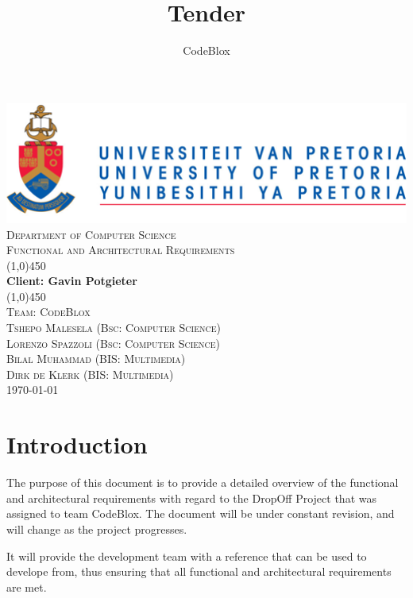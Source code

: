 \documentclass[a4paper,12pt]{article}
\author{CodeBlox}
\title{Tender}
\begin{document}
	\setlength{\parskip}{6pt}
	
	\begin{titlepage}
		\begin{center}
			\includegraphics[width=1\textwidth]{./Pictures/up_logo.png}\\[1.5cm] 
			\textsc{\LARGE Department of Computer Science} \\ [.5cm]
			\textsc{\Large Functional and Architectural Requirements} \\ [.5cm]
			\line(1,0){450}\\[.5cm]
			\huge{\bfseries Client: Gavin Potgieter}\\
			\line(1,0){450}\\[.5cm]
			\textsc{\LARGE Team: CodeBlox}\\ [0.5cm]
			
			
			\textsc{\large Tshepo Malesela (Bsc: Computer Science)}\\
			\textsc{\large Lorenzo Spazzoli (Bsc: Computer Science)}\\
			\textsc{\large Bilal Muhammad (BIS: Multimedia)}\\
			\textsc{\large Dirk de Klerk (BIS: Multimedia)}\\ [3.9cm]
			
			\large\today
		\end{center}
	\end{titlepage}
	
	\tableofcontents
	\thispagestyle{empty}
	\footnotesize
	\normalsize
	
	
	
	
	\newpage
	\section{Introduction}
	The purpose of this document is to provide a detailed overview of the functional and architectural requirements with regard to the DropOff Project that was assigned to team CodeBlox. The document will be under constant revision, and will change as the project progresses. 
	
	{\noindent}It will provide the development team with a reference that can be used to develope from, thus ensuring that all functional and architectural requirements are met.
	
\end{document}
